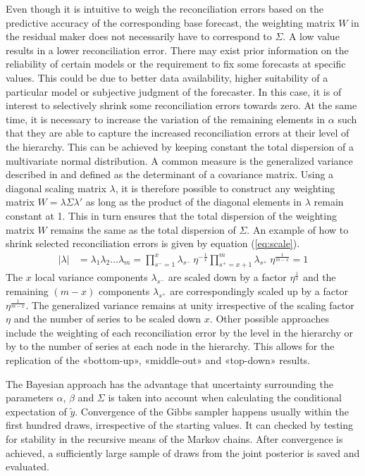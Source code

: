 \documentclass[a4paper,fleqn,11pt]{article}
\begin{document}
\begin{enumerate}
Even though it is intuitive to weigh the reconciliation errors based on the predictive accuracy of the corresponding base forecast, the weighting matrix $W$ in the residual maker does not necessarily have to correspond to $\Sigma$. A low value results in a lower reconciliation error. There may exist prior information on the reliability of certain models or the requirement to fix some forecasts at specific values. This could be due to better data availability, higher suitability of a particular model or subjective judgment of the forecaster. In this case, it is of interest to selectively shrink some reconciliation errors towards zero. At the same time, it is necessary to increase the variation of the remaining elements in $\alpha$ such that they are able to capture the increased reconciliation errors at their level of the hierarchy. This can be achieved by keeping constant the total dispersion of a multivariate normal distribution. A common measure is the generalized variance described in \cite{Mustonen1997} and defined as the determinant of a covariance matrix. Using a diagonal scaling matrix $\lambda$, it is therefore possible to construct any weighting matrix $W =  \lambda\Sigma\lambda'$ as long as the product of the diagonal elements in $\lambda$ remain constant at 1. This in turn ensures that the total dispersion of the weighting matrix $W$ remains the same as the total dispersion of $\Sigma$. An example of how to shrink selected reconciliation errors is given by equation (\ref{eq:scale}).
\begin{align}
	\label{eq:scale}
	|\lambda| &= \lambda_1 \lambda_2 \hdots \lambda_m
	= \prod_{s^- = 1}^{x} \lambda_{s^-}\ \eta^{-\frac{1}{x}}   \prod_{s^+ = x+1}^{m} \lambda_{s^+}\ \eta^{\frac{1}{m-x}} = 1
\end{align}
The $x$ local variance components $\lambda_{s^-}$ are scaled down by a factor $\eta^{\frac{1}{x}}$ and the remaining $(m-x)$ components $\lambda_{s^+}$ are correspondingly scaled up by a factor $\eta^{\frac{1}{m-x}}$. The generalized variance remains at unity irrespective of the scaling factor $\eta$ and the number of series to be scaled down $x$. Other possible approaches include the weighting of each reconciliation error by the level in the hierarchy or by to the number of series at each node in the hierarchy. This allows for the replication of the «bottom-up», «middle-out» and «top-down» results.

\end{enumerate}

\noindent The Bayesian approach has the advantage that uncertainty surrounding the parameters $\alpha$, $\beta$ and $\Sigma$ is taken into account when calculating the conditional expectation of $\tilde{y}$. Convergence of the Gibbs sampler happens usually within the first hundred draws, irrespective of the starting values. It can checked by testing for stability in the recursive means of the Markov chains. After convergence is achieved, a sufficiently large sample of draws from the joint posterior is saved and evaluated.\\
\end{document}
